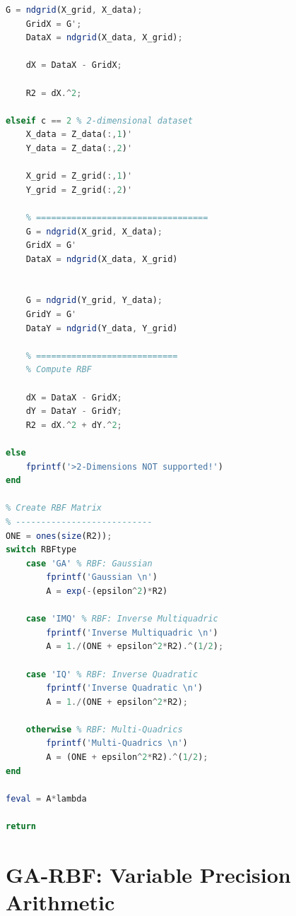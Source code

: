 \documentclass[11pt]{article}
\begin{document}
\begin{lstlisting}[language=octave]
    G = ndgrid(X_grid, X_data);
    GridX = G';
    DataX = ndgrid(X_data, X_grid);
    
    dX = DataX - GridX;
    
    R2 = dX.^2;
    
elseif c == 2 % 2-dimensional dataset
    X_data = Z_data(:,1)'
    Y_data = Z_data(:,2)'
       
    X_grid = Z_grid(:,1)'
    Y_grid = Z_grid(:,2)'

    % ==================================
    G = ndgrid(X_grid, X_data);
    GridX = G'
    DataX = ndgrid(X_data, X_grid)
    
   
    G = ndgrid(Y_grid, Y_data);
    GridY = G'
    DataY = ndgrid(Y_data, Y_grid)
    
    % ============================
    % Compute RBF
    
    dX = DataX - GridX;
    dY = DataY - GridY;
    R2 = dX.^2 + dY.^2;
    
else
    fprintf('>2-Dimensions NOT supported!')
end

% Create RBF Matrix
% ---------------------------
ONE = ones(size(R2));
switch RBFtype
    case 'GA' % RBF: Gaussian
        fprintf('Gaussian \n')
        A = exp(-(epsilon^2)*R2)
        
    case 'IMQ' % RBF: Inverse Multiquadric
        fprintf('Inverse Multiquadric \n')
        A = 1./(ONE + epsilon^2*R2).^(1/2);
        
    case 'IQ' % RBF: Inverse Quadratic
        fprintf('Inverse Quadratic \n')
        A = 1./(ONE + epsilon^2*R2);
        
    otherwise % RBF: Multi-Quadrics
        fprintf('Multi-Quadrics \n')
        A = (ONE + epsilon^2*R2).^(1/2);
end

feval = A*lambda

return
\end{lstlisting}

\section{GA-RBF: Variable Precision Arithmetic}
\end{document}
